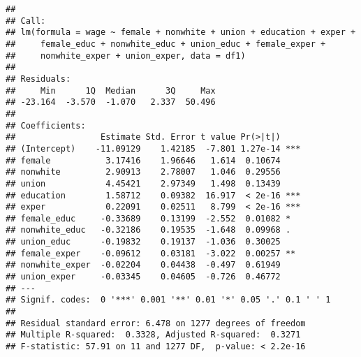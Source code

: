 \documentclass[
]{book}
\newenvironment{Shaded}{\begin{snugshade}}{\end{snugshade}}
\newcommand{\DataTypeTok}[1]{\textcolor[rgb]{0.13,0.29,0.53}{#1}}
\newcommand{\KeywordTok}[1]{\textcolor[rgb]{0.13,0.29,0.53}{\textbf{#1}}}
\newcommand{\NormalTok}[1]{#1}
\newcommand{\OperatorTok}[1]{\textcolor[rgb]{0.81,0.36,0.00}{\textbf{#1}}}
\newcommand{\StringTok}[1]{\textcolor[rgb]{0.31,0.60,0.02}{#1}}
\begin{document}
\begin{Shaded}
\end{Shaded}

\begin{verbatim}
## 
## Call:
## lm(formula = wage ~ female + nonwhite + union + education + exper + 
##     female_educ + nonwhite_educ + union_educ + female_exper + 
##     nonwhite_exper + union_exper, data = df1)
## 
## Residuals:
##     Min      1Q  Median      3Q     Max 
## -23.164  -3.570  -1.070   2.337  50.496 
## 
## Coefficients:
##                 Estimate Std. Error t value Pr(>|t|)    
## (Intercept)    -11.09129    1.42185  -7.801 1.27e-14 ***
## female           3.17416    1.96646   1.614  0.10674    
## nonwhite         2.90913    2.78007   1.046  0.29556    
## union            4.45421    2.97349   1.498  0.13439    
## education        1.58712    0.09382  16.917  < 2e-16 ***
## exper            0.22091    0.02511   8.799  < 2e-16 ***
## female_educ     -0.33689    0.13199  -2.552  0.01082 *  
## nonwhite_educ   -0.32186    0.19535  -1.648  0.09968 .  
## union_educ      -0.19832    0.19137  -1.036  0.30025    
## female_exper    -0.09612    0.03181  -3.022  0.00257 ** 
## nonwhite_exper  -0.02204    0.04438  -0.497  0.61949    
## union_exper     -0.03345    0.04605  -0.726  0.46772    
## ---
## Signif. codes:  0 '***' 0.001 '**' 0.01 '*' 0.05 '.' 0.1 ' ' 1
## 
## Residual standard error: 6.478 on 1277 degrees of freedom
## Multiple R-squared:  0.3328, Adjusted R-squared:  0.3271 
## F-statistic: 57.91 on 11 and 1277 DF,  p-value: < 2.2e-16
\end{verbatim}
\end{document}

